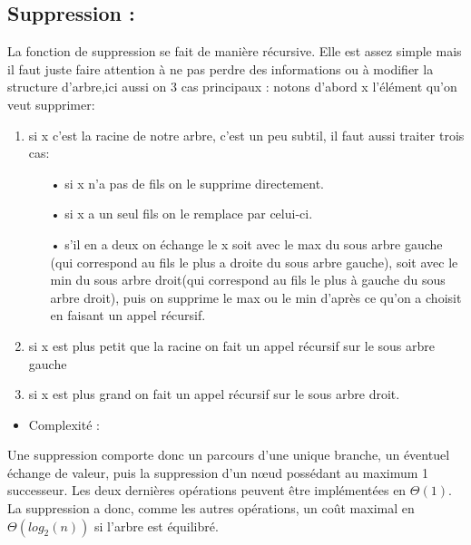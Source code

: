 \documentclass{report}
\begin{document}
\subsection{Suppression :} 
La fonction de suppression se fait de manière récursive. Elle est assez simple mais il faut juste faire attention à ne pas perdre des informations ou à modifier la structure d'arbre,ici aussi on 3 cas principaux :
notons d'abord x l'élément qu'on veut supprimer: 
\begin{enumerate}
\item si x c'est la racine de notre arbre, c'est un peu subtil, il faut aussi traiter trois cas:
\begin{itemize}
    \item[•] si x n'a pas de fils on le supprime directement.
    \item[•] si x a un seul fils on le remplace par celui-ci.
    \item[•] s'il en a deux on échange le x soit avec le max du sous arbre gauche (qui correspond au fils le plus a droite du sous arbre gauche), soit avec le min du sous arbre droit(qui correspond au fils le plus à gauche du sous arbre droit), puis on supprime le max ou le min d'après ce qu'on a choisit en faisant un appel récursif.
\end{itemize}
\item si x est plus petit que la racine on fait un appel récursif sur le sous arbre gauche 
\item si x est plus grand on fait un appel récursif sur le sous arbre droit.
\end{enumerate}
\begin{itemize}
    \item Complexité :
\end{itemize} 
Une suppression comporte donc un parcours d’une
unique branche, un éventuel échange de valeur, puis
la suppression d’un nœud possédant au maximum 1 successeur.
Les deux dernières opérations peuvent être
implémentées en $\Theta(1)$.
La suppression a donc, comme les autres opérations,
un coût maximal en $\Theta(log_2(n))$ si l’arbre est équilibré.
\end{document}
